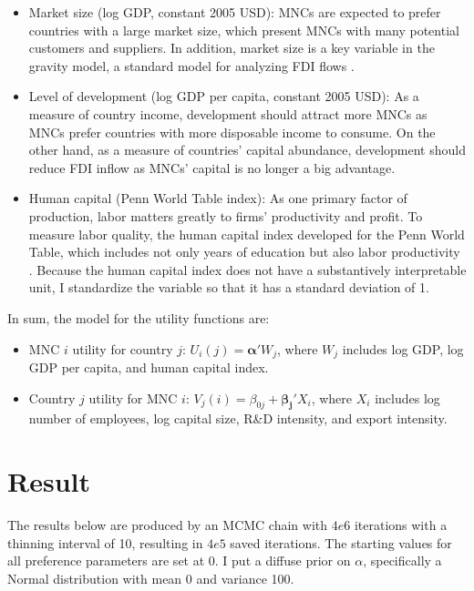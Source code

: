 \begin{itemize}
\item Market size (log GDP, constant 2005 USD): MNCs are expected to prefer countries with a large market
  size, which present MNCs with many potential customers and suppliers. In
  addition, market size is a key variable in the gravity
  model, a standard model for analyzing FDI flows \citet{Bergstrand2007}.

\item Level of development (log GDP per capita, constant 2005 USD): As a measure
  of country income, development should attract more MNCs as MNCs prefer
  countries  with
  more disposable income to consume. On the other hand, as a measure of
  countries' capital
  abundance, development should reduce FDI inflow as MNCs' capital is no longer
  a big advantage.

\item Human capital (Penn World Table index): As one primary factor of
  production, labor matters greatly to firms' productivity and profit. To
  measure labor quality, the human capital index developed for the Penn World
  Table, which includes not only years of education but also labor productivity
  \citep{Feenstra2015}. Because the human capital index does not have a
  substantively interpretable unit, I standardize the variable so that it has a
  standard deviation of 1.
\end{itemize}

In sum, the model for the utility functions are:

\begin{itemize}
\item MNC $i$ utility for country $j$: $U_i(j) = \bm{\alpha}' W_j $, where $W_j$ includes log GDP, log GDP per capita, and human capital index.
\item Country $j$ utility for MNC $i$: $V_j(i) = \beta_{0j} + \bm{\beta_j}'
  X_i$, where $X_i$ includes log number of employees, log capital size, R\&D intensity, and
export intensity. 
\end{itemize}

\section{Result}
\label{sec:result}

The results below are produced by an MCMC chain with $4e6$ iterations with a
thinning interval of 10, resulting in $4e5$ saved iterations. The starting
values for all preference parameters are set at 0. I put a diffuse prior on
$\alpha$, specifically a Normal distribution with mean 0 and variance 100.

